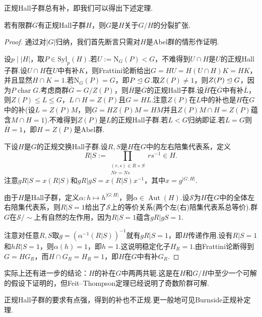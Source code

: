正规Hall子群总有补，即我们可以得出下述定理.
\begin{thm}
	\par 若有限群$G$有正规Hall子群$H$，则$G$是$H$关于$G/H$的分裂扩张.\hypertarget{thm:SchurZassenhaus}{}
\end{thm}
\begin{proof}
	通过对$|G|$归纳，我们首先断言只需对$H$是Abel群的情形作证明.

	设$p\mid|H|$，取$P\in\mathrm{Syl}_p(H)$.若$U:=\mathrm{N}_G(P)<G$，不难得到$U\cap H$是$U$的正规Hall子群.设$U\cap H$在$U$中有补$K$，则Frattini论断给出$G=HU=H(U\cap H)K=HK$，并且显然$H\cap K=1$.若$\mathrm{N}_G(P)=G$，即$P\trianglelefteq G$.取$Z(P)\ne 1$，则$Z(P)\trianglelefteq G$，因为$P\operatorname*{char} G$.考虑商群$\overline{G}=G/Z(P)$，则$\overline{H}$是$\overline{G}$的正规Hall子群.设$\overline{H}$在$\overline{G}$中有补$\overline{L}$，则$Z(P)\le L\le G$，$L\cap H=Z(P)$且$G=HL$.注意$Z(P)$在$L$中的补也是$H$在$G$中的补(设$L=Z(P)M$，则$G=HZ(P)M=HM$并且$Z(P)M\cap H=Z(P)$蕴含$M\cap H=1$).不难得到$Z(P)$是$L$的正规Hall子群.若$L<G$归纳即证.若$L=G$则$\overline{H}=1$，即$H=Z(P)$是Abel群.

	下设$H$是$G$的正规交换Hall子群.设$R,S$是$H$在$G$中的左右陪集代表系，定义
	\[
		R|S:=\prod_{\substack{(r,s)\in R\times S\\ Nr=Ns}}rs^{-1}\in H.
	\]
	注意$gR|S=x(R|S)$和$gR|gS=x(R|S)x^{-1}$，其中$x=g^{|G:H|}$.

	由于$H$是Hall子群，定义$\alpha\colon h\mapsto h^{|G:H|}$，则$\alpha\in\operatorname*{Aut}(H)$.设$\mathcal{S}$为$H$在$G$中的全体左右陪集代表系，则$R|S=1$给出了$\mathcal{S}$上的等价关系(两个左(右)陪集代表系总等价).群$G$在$\mathcal{S}/\sim$上有自然的左作用，因为$R|S=1$蕴含$gR|gS=1$.

	注意对任意$R,S$取$g=(\alpha^{-1}(R|S))^{-1}$就有$gR|S=1$，即$H$传递作用.设有$R|S=1$和$hR|S=1$，则$\alpha(h)=1$，即$h=1$.这说明稳定化子$H_R=1$.由Frattini论断得到$G=HG_R$，而$H\cap G_R=H_R=1$，即$H$在$G$中有补$G_R$.
\end{proof}
\begin{remark}
	实际上还有进一步的结论：{\heiti $H$的补在$G$中两两共轭}.这是在$H$和$G/H$中至少一个可解的假设下证明的，但Feit--Thompson定理已经说明了奇数阶群可解.
\end{remark}

正规Hall子群的要求有点强，得到的补也不正规.更一般地可见Burnside正规补定理.%
